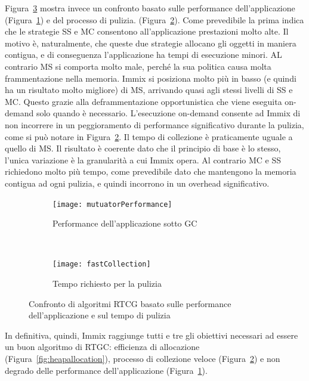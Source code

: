 Figura~\ref{fig:rtgc} mostra invece un confronto basato sulle performance dell'applicazione (Figura~\ref{fig:mutuatorPerformance}) e del processo di pulizia. (Figura~\ref{fig:fastCollection}). Come prevedibile la prima indica che le strategie SS e MC consentono all'applicazione prestazioni molto alte. Il motivo è, naturalmente, che queste due strategie allocano gli oggetti in maniera contigua, e di conseguenza l'applicazione ha tempi di esecuzione minori. AL contrario MS si comporta molto male, perché la sua politica causa molta frammentazione nella memoria. Immix si posiziona molto più in basso (e quindi ha un risultato molto migliore) di MS, arrivando quasi agli stessi livelli di SS e MC. Questo grazie alla deframmentazione opportunistica che viene eseguita on-demand solo quando è necessario. L'esecuzione on-demand consente ad Immix di non incorrere in un peggioramento di performance significativo durante la pulizia, come si può notare in Figura~\ref{fig:fastCollection}. Il tempo di collezione è praticamente uguale a quello di MS. Il risultato è coerente dato che il principio di base è lo stesso, l'unica variazione è la granularità a cui Immix opera. Al contrario MC e SS richiedono molto più tempo, come prevedibile dato che mantengono la memoria contigua ad ogni pulizia, e quindi incorrono in un overhead significativo.
\begin{figure}
	\centering
	\begin{subfigure}[b]{0.4\textwidth}
		\texttt{[image: mutuatorPerformance]}
		\caption{Performance dell'applicazione sotto GC}
		\label{fig:mutuatorPerformance}
	\end{subfigure}
	~
	\begin{subfigure}[b]{0.4\textwidth}
		\texttt{[image: fastCollection]}
		\caption{Tempo richiesto per la pulizia}
		\label{fig:fastCollection}
	\end{subfigure}
	\caption[Confronto di algoritmi RTCG]{Confronto di algoritmi RTCG basato sulle performance dell'applicazione e sul tempo di pulizia}\label{fig:rtgc}
\end{figure}

In definitiva, quindi, Immix raggiunge tutti e tre gli obiettivi necessari ad essere un buon algoritmo di RTGC: efficienza di allocazione (Figura~\ref{fig:heapallocation}), processo di collezione veloce (Figura~\ref{fig:fastCollection}) e non degrado delle performance dell'applicazione (Figura~\ref{fig:mutuatorPerformance}).